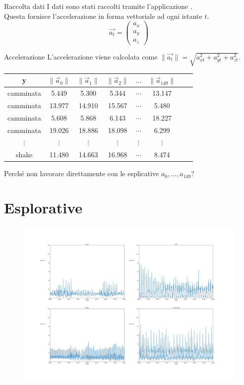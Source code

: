 \documentclass{beamer}
\begin{document}
\begin{frame}{Raccolta dati}
I dati sono stati raccolti tramite l'applicazione \cite{kumarPhonePiSampleServer2019}.\\
\smallskip
Questa fornisce l'accelerazione in forma vettoriale ad ogni istante $t$.
\[
\vec{a_t} = \begin{pmatrix}
a_x \\ a_y \\ a_z
\end{pmatrix}
\]
\end{frame}

\begin{frame}{Accelerazione}
L'accelerazione viene calcolata come $\|\vec{a_t}\| =\sqrt{a_{xt}^2+a_{yt}^2+a_{zt}^2}$.
\begin{table}[H]
\begin{tabular}{cccccccc}
\toprule
y & $\|\vec{a}_0\|$ & $\|\vec{a}_1\|$ & $\|\vec{a}_2\|$  & $\dots$ & $\|\vec{a}_{149}\|$\\
\midrule
camminata & 5.449 & 5.300 & 5.344 &  $\cdots$ & 13.147\\
camminata & 13.977 & 14.910 & 15.567 &  $\cdots$ & 5.480\\
camminata & 5.608 & 5.868 & 6.143 &  $\cdots$ & 18.227\\
camminata & 19.026 & 18.886 & 18.098 &  $\cdots$ & 6.299\\
$\vdots$ & $\vdots$ & $\vdots$ & $\vdots$ &  $\vdots$ & $\vdots$\\
shake & 11.480 & 14.663 & 16.968 &  $\cdots$ & 8.474\\

\bottomrule
\end{tabular}
\end{table}
Perché non lavorare direttamente con le esplicative $a_0,\dots,a_{149}$?
\end{frame}

\section{Esplorative}
\begin{frame}
\begin{figure}[H]
\includegraphics[width=\textwidth]{../figure/espl.png}
\end{figure}
\end{frame}


\printbibliography
\end{document}
